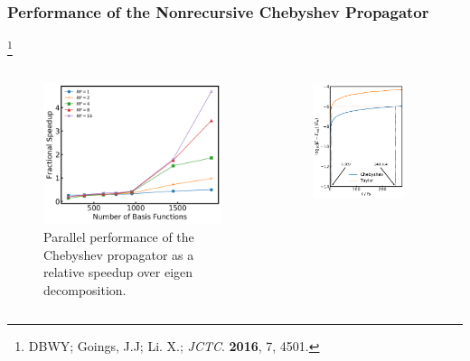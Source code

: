 \documentclass{beamer}
\newcommand\blfootnote[1]{%
  \begingroup
  \renewcommand\thefootnote{}\footnote{#1}%
  \addtocounter{footnote}{-1}%
  \endgroup
}
\begin{document}
\begin{frame}
\frametitle{Performance of the Nonrecursive Chebyshev Propagator}
\blfootnote{DBWY; Goings, J.J; Li. X.; \emph{JCTC}. \textbf{2016}, 7, 4501.}

\vspace{-1cm}
\begin{columns}
\begin{column}{0.5\textwidth}
\begin{figure}
\includegraphics[width=\textwidth]{Speedup_1000.png}
\caption{\footnotesize Parallel performance of the Chebyshev propagator as a relative speedup over eigen decomposition.}
\end{figure}
\end{column}
\begin{column}{0.5\textwidth}
\begin{figure}
\includegraphics[width=0.8\textwidth]{Error2WAnnote}

\end{figure}
\end{column}
\end{columns}
\end{frame}
\end{document}
